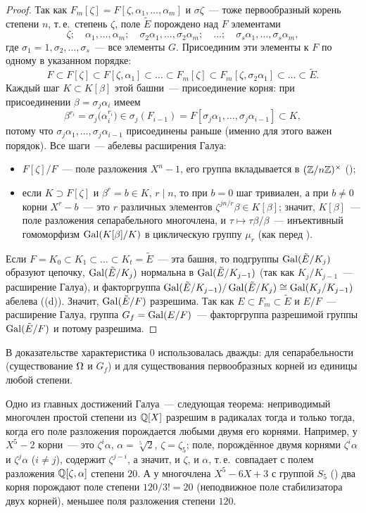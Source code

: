 \begin{proof}
Так как $F_m[\zeta]=F[\zeta,\alpha_1,\dots,\alpha_m]$ и $\sigma\zeta$~--- тоже первообразный корень степени $n$, т.\,е.\ степень
$\zeta$, поле $\tilde E$ порождено над $F$ элементами
\[
\zeta;\quad\alpha_1,\dots,\alpha_m;\quad\sigma_2\alpha_1,\dots,\sigma_2\alpha_m;\quad\dots;\quad\sigma_s\alpha_1,\dots,\sigma_s\alpha_m,
\]
где $\sigma_1=1,\sigma_2,\dots,\sigma_s$~--- все элементы $G$. Присоединим эти элементы к $F$ по одному в указанном
порядке:
\[
F\subset F[\zeta]\subset F[\zeta,\alpha_1]\subset\dots\subset F_m[\zeta]\subset F_m[\zeta,\sigma_2\alpha_1]\subset\dots\subset\tilde E.
\]
Каждый шаг $K\subset K[\beta]$ этой башни~--- присоединение корня: при присоединении $\beta=\sigma_j\alpha_i$ имеем
\[
\beta^{r_i}=\sigma_j\bigl(\alpha_i^{r_i}\bigr)\in\sigma_j(F_{i-1})=F[\sigma_j\alpha_1,\dots,\sigma_j\alpha_{i-1}]\subset K,
\]
потому что $\sigma_j\alpha_1,\dots,\sigma_j\alpha_{i-1}$ присоединены раньше (именно для этого важен порядок). Все шаги~---
абелевы расширения Галуа:
\begin{itemize}
\item $F[\zeta]/F$~--- поле разложения $X^n-1$, его группа вкладывается в $(\mathbb Z/n\mathbb Z)^\times$ ();
\item если $K\supset F[\zeta]$ и $\beta^r=b\in K$, $r\mid n$, то при $b=0$ шаг тривиален, а при $b\ne0$ корни $X^r-b$~--- это
$r$ различных элементов $\zeta^{jn/r}\beta\in K[\beta]$; значит, $K[\beta]$~--- поле разложения сепарабельного многочлена, и
$\tau\mapsto\tau\beta/\beta$~--- инъективный гомоморфизм $\operatorname{Gal}(K[\beta]/K)$ в циклическую группу $\mu_r$ (как перед ).
\end{itemize}
Если $F=K_0\subset K_1\subset\dots\subset K_t=\tilde E$~--- эта башня, то подгруппы $\operatorname{Gal}(\tilde E/K_j)$ образуют цепочку,
$\operatorname{Gal}(\tilde E/K_j)$ нормальна в $\operatorname{Gal}(\tilde E/K_{j-1})$ (так как $K_j/K_{j-1}$~--- расширение Галуа), и факторгруппа
$\operatorname{Gal}(\tilde E/K_{j-1})/\operatorname{Gal}(\tilde E/K_j)\cong\operatorname{Gal}(K_j/K_{j-1})$ абелева ((d)). Значит, $\operatorname{Gal}(\tilde E/F)$ разрешима. Так как
$E\subset F_m\subset\tilde E$ и $E/F$~--- расширение Галуа, группа $G_f=\operatorname{Gal}(E/F)$~--- факторгруппа разрешимой группы
$\operatorname{Gal}(\tilde E/F)$ и потому разрешима.
\end{proof}

В доказательстве характеристика $0$ использовалась дважды: для сепарабельности (существование $\Omega$ и $G_f$) и для
существования первообразных корней из единицы любой степени.

\begin{aside}[5.35]
Одно из главных достижений Галуа~--- следующая теорема: неприводимый многочлен простой степени из $\mathbb Q[X]$ разрешим в
радикалах тогда и только тогда, когда его поле разложения порождается любыми двумя его корнями. Например, у $X^5-2$
корни~--- это $\zeta^i\alpha$, $\alpha=\sqrt[5]2$, $\zeta=\zeta_5$; поле, порождённое двумя корнями $\zeta^i\alpha$ и $\zeta^j\alpha$
($i\ne j$), содержит $\zeta^{j-i}$, а значит, и $\zeta$, и $\alpha$, т.\,е.\ совпадает с полем разложения $\mathbb Q[\zeta,\alpha]$ степени
$20$. А у многочлена $X^5-6X+3$ с группой $S_5$ () два корня
порождают поле степени $120/3!=20$ (неподвижное поле стабилизатора двух корней), меньшее поля разложения степени $120$.
\end{aside}

